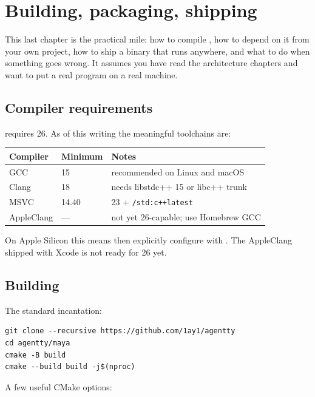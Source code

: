 \chapter{Building, packaging, shipping}
\label{ch:build}

This last chapter is the practical mile: how to compile \maya{}, how
to depend on it from your own project, how to ship a binary that
runs anywhere, and what to do when something goes wrong. It assumes
you have read the architecture chapters and want to put a real
program on a real machine.

\section{Compiler requirements}

\maya{} requires \cpp{}26. As of this writing the meaningful
toolchains are:

\begin{center}
\small
\begin{tabular}{lll}
\textbf{Compiler} & \textbf{Minimum} & \textbf{Notes} \\
\hline
GCC                & 15 & recommended on Linux and macOS \\
Clang              & 18 & needs libstdc++ 15 or libc++ trunk \\
MSVC               & 14.40 & \cpp{}23 + \texttt{/std:c++latest} \\
AppleClang         & --- & not yet \cpp{}26-capable; use Homebrew GCC \\
\end{tabular}
\end{center}

On Apple Silicon this means  then explicitly
configure with . The
AppleClang shipped with Xcode is not ready for \cpp{}26 yet.

\section{Building \maya{}}

The standard incantation:

\begin{lstlisting}[style=shell]
git clone --recursive https://github.com/1ay1/agentty
cd agentty/maya
cmake -B build
cmake --build build -j$(nproc)
\end{lstlisting}

A few useful CMake options:

